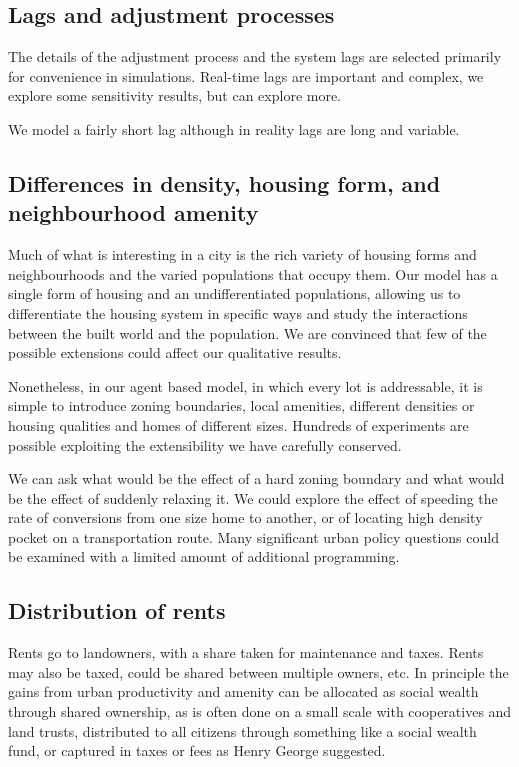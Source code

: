 \subsection{Lags and adjustment processes}
The details of the adjustment process and the system lags are selected primarily for convenience in simulations. Real-time lags are important and complex, we explore some sensitivity results, but can explore more. 

We model a fairly short lag although in reality lags are long and variable. 


\subsection{Differences in density, housing form, and neighbourhood amenity}

Much of what is interesting in a city is the rich variety of housing forms and neighbourhoods and the varied populations that occupy them. Our model has a single form of housing and an undifferentiated populations, allowing us to differentiate the housing system in specific ways and study the interactions between the built world and the population. We are convinced that few of the possible extensions could affect our qualitative results. 

Nonetheless, in our agent based model, in which every lot is  addressable, it is simple to introduce zoning boundaries, local amenities, different densities or housing qualities and homes of different sizes. Hundreds of experiments are possible exploiting  the extensibility we have carefully conserved.  

We can ask what would be the effect of a hard zoning boundary and what would be the effect of suddenly relaxing it. We could explore the effect of speeding the rate of conversions from one size  home to another, or of locating high density pocket on a transportation route. Many significant urban policy questions could be examined with a limited amount of additional programming. 

\subsection{Distribution of rents}
Rents go to landowners, with a share taken for maintenance and taxes.
Rents may also be taxed, could be shared between multiple owners, etc.
In principle the gains from urban productivity and amenity can be allocated as social wealth through shared ownership, as is often done on a small scale with cooperatives and land trusts, distributed to all citizens through something like a social wealth fund, or captured in taxes or fees as Henry George suggested. 

